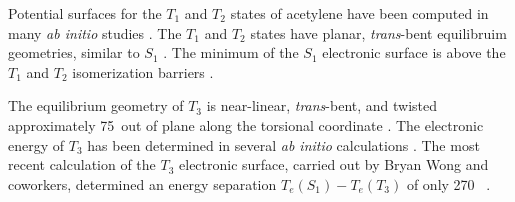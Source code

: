 \documentclass[12pt]{mitthesis}
\begin{document}


Potential surfaces for the $T_1$ and $T_2$ states of acetylene have
been computed in many \emph{ab initio} studies \cite{demoulin75,
  wetmore78, lischka86, yamaguchi93, cui96, cui97, malsch98, dallos02,
  ventura03}.  The $T_1$ and $T_2$ states have planar,
\emph{trans}-bent equilibruim geometries, similar to $S_1$
\cite{demoulin75, wetmore78, yamaguchi93}.  The minimum of the $S_1$
electronic surface is above the $T_1$ and $T_2$ isomerization barriers
\cite{vacek96, sherrill96}.

The equilibrium geometry of $T_3$ is near-linear, \emph{trans}-bent,
and twisted approximately 75\degrees\ out of plane along the torsional
coordinate \cite{ventura03, thom07}.  The electronic energy of $T_3$
has been determined in several \emph{ab initio} calculations
\cite{malsch98, ventura03, thom07}.
The most recent calculation of the $T_3$ electronic surface, carried
out by Bryan Wong and coworkers, determined an energy separation
$T_e(S_1)-T_e(T_3)$ of only 270 \rcm\ \cite{thom07}.




\end{document}

